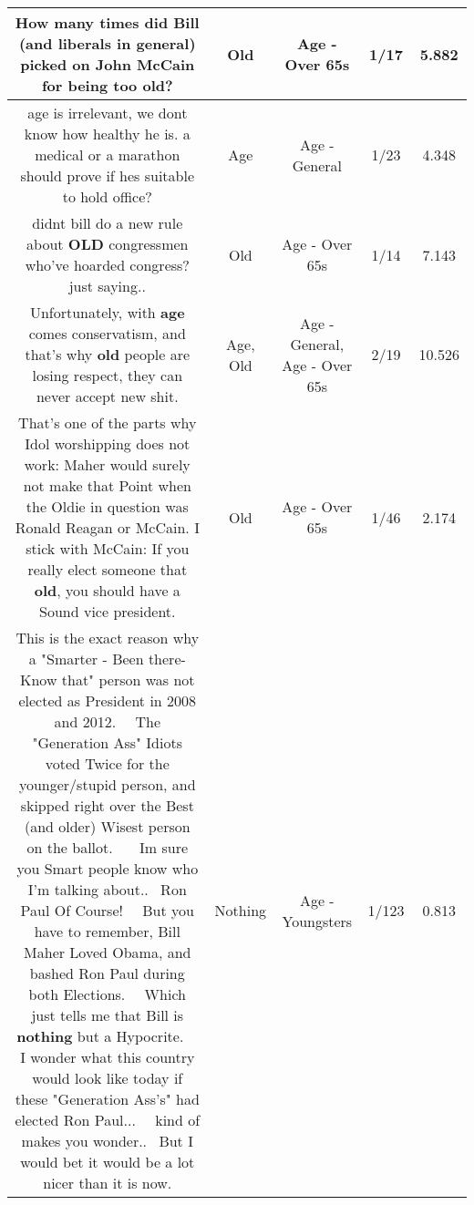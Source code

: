 \documentclass[11pt]{article}
\newlength\mylength
\begin{document}
\begin{center}
\begin{longtable}{|C{.65\mylength}|C{.30\mylength}|C{.12\mylength}|C{.12\mylength}|C{.12\mylength}|}
  \small How many times did Bill (and liberals in general) picked on John McCain for being too \textbf{old}?\normalsize   & Old & Age - Over 65s & 1/17 & 5.882 \\  \hline
  \small age is irrelevant, we dont know how healthy he is. a medical or a marathon should prove if hes suitable to hold office?\normalsize   & Age & Age - General & 1/23 & 4.348 \\  \hline
  \small didnt bill do a new rule about \textbf{OLD} congressmen who've hoarded congress? just saying..\normalsize   & Old & Age - Over 65s & 1/14 & 7.143 \\  \hline
  \small Unfortunately, with \textbf{age} comes conservatism, and that's why \textbf{old} people are losing respect, they can never accept new shit.\normalsize   & Age, Old & Age - General, Age - Over 65s & 2/19 & 10.526 \\  \hline
  \small That's one of the parts why Idol worshipping does not work: Maher would surely not make that Point when the Oldie in question was Ronald Reagan or McCain. I stick with McCain: If you really elect someone that \textbf{old}, you should have a Sound vice president.\normalsize   & Old & Age - Over 65s & 1/46 & 2.174 \\  \hline
  \small This is the exact reason why a "Smarter - Been there- Know that" person was not elected as President in 2008 and 2012.   The "Generation Ass" Idiots voted Twice for the younger/stupid person, and skipped right over the Best (and older) Wisest person on the ballot.    Im sure you Smart people know who I'm talking about..  Ron Paul Of Course!   But you have to remember, Bill Maher Loved Obama, and bashed Ron Paul during both Elections.   Which just tells me that Bill is \textbf{nothing} but a Hypocrite.   I wonder what this country would look like today if these "Generation Ass's" had elected Ron Paul...   kind of makes you wonder..  But I would bet it would be a lot nicer than it is now.\normalsize   & Nothing & Age - Youngsters & 1/123 & 0.813 \\  \hline

\end{longtable}
\end{center}
\end{document}
